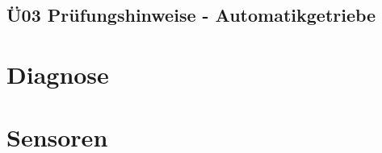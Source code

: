 \section{Ü03 Prüfungshinweise - Automatikgetriebe}



\chapter{Diagnose}

\chapter{Sensoren}






%
%



%



